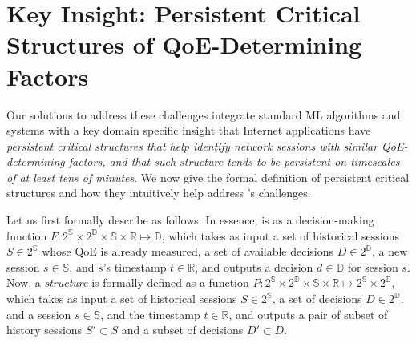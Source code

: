 

\section{Key Insight: Persistent Critical Structures of QoE-Determining Factors}
\label{sec:overview:unifying}


Our solutions to address these challenges integrate 
standard ML algorithms and 
systems with a key domain specific insight that Internet
applications have {\em persistent critical structures that help identify 
network sessions with similar QoE-determining factors, and that such 
structure tends to be persistent on timescales of 
at least tens of minutes}.
We now give the formal definition of persistent critical structures 
and how they intuitively help address \ddn's challenges.


Let us first formally describe \ddn as follows. 
In essence, \ddn is as a decision-making function 
$F:2^\mathbb{S}\times2^\mathbb{D}\times\mathbb{S}\times\mathbb{R}
\mapsto\mathbb{D}$, which takes as input a set of historical 
sessions $S\in2^\mathbb{S}$ whose 
QoE is already measured, a set of available decisions 
$D\in2^\mathbb{D}$, a new session $s\in\mathbb{S}$, and $s$'s timestamp
$t\in\mathbb{R}$,
and outputs a decision $d\in\mathbb{D}$ for session $s$.
Now, a {\em structure} is formally defined as a function 
$P:2^\mathbb{S}\times2^\mathbb{D}\times\mathbb{S}\times\mathbb{R}
\mapsto2^\mathbb{S}\times2^\mathbb{D}$,
which takes as input a set of historical  sessions $S\in2^\mathbb{S}$, 
a set of decisions $D\in2^\mathbb{D}$, and a session $s\in\mathbb{S}$, 
and the timestamp $t\in\mathbb{R}$, and outputs a pair of  subset of history sessions
$S'\subset{S}$ and a  subset of decisions $D'\subset{D}$.


